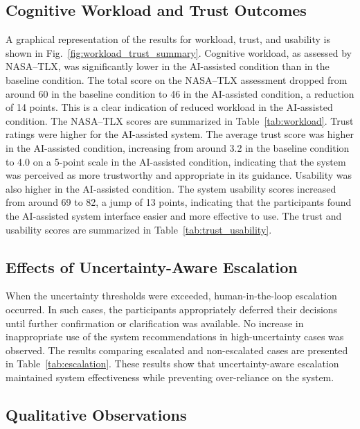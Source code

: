 \documentclass[journal]{IEEEtran}
\theoremstyle{plain}
\theoremstyle{definition}
\begin{document}
    \subsection{Cognitive Workload and Trust Outcomes}

    A graphical representation of the results for workload, trust, and usability is shown in Fig.~\ref{fig:workload_trust_summary}.
    Cognitive workload, as assessed by NASA--TLX, was significantly lower in the AI-assisted condition than in the baseline condition. The total score on the NASA--TLX assessment dropped from around 60 in the baseline condition to 46 in the AI-assisted condition, a reduction of 14 points. This is a clear indication of reduced workload in the AI-assisted condition. The NASA--TLX scores are summarized in Table~\ref{tab:workload}.
    Trust ratings were higher for the AI-assisted system. The average trust score was higher in the AI-assisted condition, increasing from around 3.2 in the baseline condition to 4.0 on a 5-point scale in the AI-assisted condition, indicating that the system was perceived as more trustworthy and appropriate in its guidance.
    Usability was also higher in the AI-assisted condition. The system usability scores increased from around 69 to 82, a jump of 13 points, indicating that the participants found the AI-assisted system interface easier and more effective to use. The trust and usability scores are summarized in Table~\ref{tab:trust_usability}.

    \subsection{Effects of Uncertainty-Aware Escalation}
    When the uncertainty thresholds were exceeded, human-in-the-loop escalation occurred. In such cases, the participants appropriately deferred their decisions until further confirmation or clarification was available. No increase in inappropriate use of the system recommendations in high-uncertainty cases was observed.
    The results comparing escalated and non-escalated cases are presented in Table~\ref{tab:escalation}. These results show that uncertainty-aware escalation maintained system effectiveness while preventing over-reliance on the system.

    \subsection{Qualitative Observations}
\end{document}
